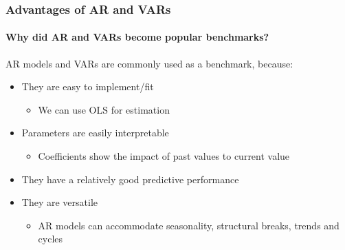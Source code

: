 \begin{frame}
    \frametitle{Advantages of AR and VARs}
    \framesubtitle{Why did AR and VARs become popular benchmarks?}

    AR models and VARs are commonly used as a benchmark, because:
    \begin{itemize}
        \item They are easy to implement/fit
              \begin{itemize}
                  \item We can use OLS for estimation
              \end{itemize}
        \item Parameters are easily interpretable
              \begin{itemize}
                  \item Coefficients show the impact of past values to current value
              \end{itemize}
        \item They have a relatively good predictive performance
        \item They are versatile
              \begin{itemize}
                  \item AR models can accommodate seasonality, structural breaks, trends and cycles
              \end{itemize}
    \end{itemize}

\end{frame}